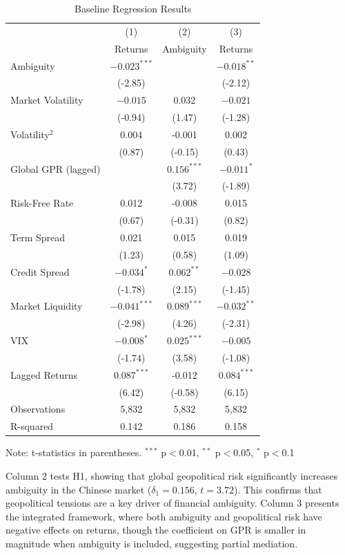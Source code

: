 \documentclass[12pt]{article}
\begin{document}
\begin{table}[htbp]
\centering
\caption{Baseline Regression Results}
\label{tab:baseline_results}
\begin{tabular}{lccc}
\toprule
 & (1) & (2) & (3) \\
 & Returns & Ambiguity & Returns \\
\midrule
Ambiguity & $-0.023^{***}$ &  & $-0.018^{**}$ \\
 & (-2.85) &  & (-2.12) \\
Market Volatility & $-0.015$ & 0.032 & $-0.021$ \\
 & (-0.94) & (1.47) & (-1.28) \\
Volatility$^2$ & 0.004 & -0.001 & 0.002 \\
 & (0.87) & (-0.15) & (0.43) \\
Global GPR (lagged) &  & $0.156^{***}$ & $-0.011^{*}$ \\
 &  & (3.72) & (-1.89) \\
Risk-Free Rate & 0.012 & -0.008 & 0.015 \\
 & (0.67) & (-0.31) & (0.82) \\
Term Spread & 0.021 & 0.015 & 0.019 \\
 & (1.23) & (0.58) & (1.09) \\
Credit Spread & $-0.034^{*}$ & $0.062^{**}$ & $-0.028$ \\
 & (-1.78) & (2.15) & (-1.45) \\
Market Liquidity & $-0.041^{***}$ & $0.089^{***}$ & $-0.032^{**}$ \\
 & (-2.98) & (4.26) & (-2.31) \\
VIX & $-0.008^{*}$ & $0.025^{***}$ & $-0.005$ \\
 & (-1.74) & (3.58) & (-1.08) \\
Lagged Returns & $0.087^{***}$ & -0.012 & $0.084^{***}$ \\
 & (6.42) & (-0.58) & (6.15) \\
\midrule
Observations & 5,832 & 5,832 & 5,832 \\
R-squared & 0.142 & 0.186 & 0.158 \\
\bottomrule
\end{tabular}
\footnotesize
Note: t-statistics in parentheses. $^{***}$ p$<$0.01, $^{**}$ p$<$0.05, $^{*}$ p$<$0.1
\end{table}

Column 2 tests H1, showing that global geopolitical risk significantly increases ambiguity in the Chinese market ($\delta_1 = 0.156$, $t = 3.72$). This confirms that geopolitical tensions are a key driver of financial ambiguity. Column 3 presents the integrated framework, where both ambiguity and geopolitical risk have negative effects on returns, though the coefficient on GPR is smaller in magnitude when ambiguity is included, suggesting partial mediation.
\end{document}
